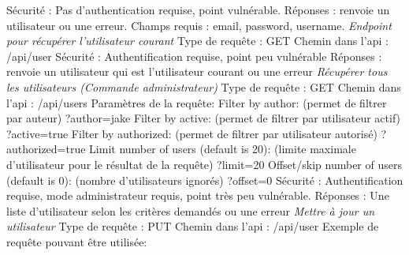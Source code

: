 \documentclass{article}
\begin{document}
Sécurité : Pas d'authentication requise, point vulnérable.
\newline
Réponses : renvoie un utilisateur ou une erreur.
\newline
Champs requis : email, password, username.
\newpage
\textit{Endpoint pour récupérer l'utilisateur courant}
\newline
Type de requête : GET
\newline
Chemin dans l'api : /api/user
\newline
Sécurité : Authentification requise, point peu vulnérable
\newline
Réponses : renvoie un utilisateur qui est l'utilisateur courant ou une erreur
\newline
\newline
\textit{Récupérer tous les utilisateurs (Commande administrateur)}
\newline
Type de requête : GET
\newline
Chemin dans l'api : /api/users
\newline
Paramètres de la requête:
\newline
Filter by author: (permet de filtrer par auteur)
\newline
?author=jake
\newline
Filter by active: (permet de filtrer par utilisateur actif)
\newline
?active=true
\newline
Filter by authorized: (permet de filtrer par utilisateur autorisé)
\newline
?authorized=true
\newline
Limit number of users (default is 20): (limite maximale d'utilisateur pour le résultat de la requête)
\newline
?limit=20
\newline
Offset/skip number of users (default is 0): (nombre d'utilisateurs ignorés)
\newline
?offset=0
\newline
Sécurité : Authentification requise, mode administrateur requis, point très peu vulnérable.
\newline
Réponses : Une liste d'utilisateur selon les critères demandés ou une erreur
\newline
\newline
\textit{Mettre à jour un utilisateur}
\newline
Type de requête : PUT
\newline
Chemin dans l'api : /api/user
\newline
Exemple de requête pouvant être utilisée:
\end{document}
